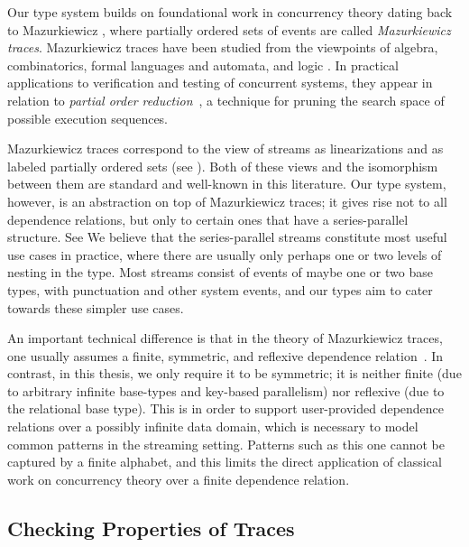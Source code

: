 Our type system builds on foundational work in concurrency theory dating back to Mazurkiewicz \cite{mazurkiewicz1986trace}, where partially ordered sets of events are called \emph{Mazurkiewicz traces}. Mazurkiewicz traces have been studied from the viewpoints of algebra, combinatorics, formal languages and automata, and
logic \cite{DiekertR1995}. In practical applications to verification and
testing of concurrent systems, they appear in relation to
\emph{partial order reduction}~\cite{God96,Peled94}, a technique for
pruning the search space of possible execution sequences.

Mazurkiewicz traces correspond to the view of streams as linearizations and as labeled partially ordered sets (see ).
Both of these views and the isomorphism between them are standard and well-known in this literature.
Our type system, however, is an abstraction on top of Mazurkiewicz traces; it
gives rise not to all dependence relations, but only to certain ones that have a series-parallel structure.
See 
We believe that the series-parallel streams constitute most useful use cases in practice, where there are usually only perhaps one or two levels of nesting in the type. Most streams consist of events of maybe one or two base types, with punctuation and other system events, and our types aim to cater towards these simpler use cases.

An important technical difference is that in the theory of Mazurkiewicz traces, one usually assumes a finite, symmetric, and reflexive dependence relation~\cite{DiekertR1995}. In contrast, in this thesis, we only require it to be symmetric; it is neither finite (due to arbitrary infinite base-types and key-based parallelism) nor reflexive (due to the relational base type). This is in order to support user-provided dependence relations over a possibly infinite data domain, which is necessary to model common patterns in the streaming setting. Patterns such as this one cannot be captured by a finite alphabet, and this limits the direct application of classical work on concurrency theory over a finite dependence relation.

\subsection{Checking Properties of Traces}

